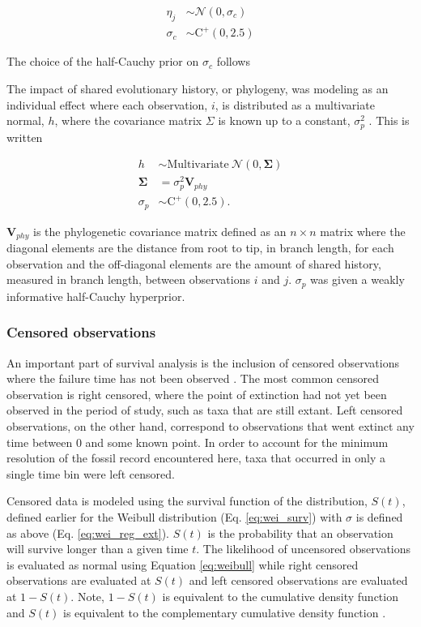 \documentclass{article}
\begin{document}
\begin{align*}
  \eta_{j} &\sim \mathcal{N}(0, \sigma_{c}) \\
  \sigma_{c} &\sim \mathrm{C}^{+}(0, 2.5)
\end{align*}

The choice of the half-Cauchy prior on \(\sigma_{c}\) follows \cite{Gelman2006a}

The impact of shared evolutionary history, or phylogeny, was modeling as an individual effect where each observation, \(i\), is distributed as a multivariate normal, \(h\), where the covariance matrix \(\Sigma\) is known up to a constant, \(\sigma_{p}^{2}\) \cite{Lynch1991,Housworth2004}. This is written

\begin{align*}
  h &\sim \mathrm{Multivariate\ }\mathcal{N}(0, \mathbf{\Sigma}) \\
  \mathbf{\Sigma} &= \sigma_{p}^{2} \mathbf{V}_{phy} \\
  \sigma_{p} &\sim \mathrm{C}^{+}(0, 2.5).
\end{align*}

\(\mathbf{V}_{phy}\) is the phylogenetic covariance matrix defined as an \(n \times n\) matrix where the diagonal elements are the distance from root to tip, in branch length, for each observation and the off-diagonal elements are the amount of shared history, measured in branch length, between observations \(i\) and \(j\). \(\sigma_{p}\) was given a weakly informative half-Cauchy hyperprior. 


\subsubsection{Censored observations} \label{sec:censor}

An important part of survival analysis is the inclusion of censored observations where the failure time has not been observed \cite{Ibrahim2001,Klein2003}. The most common censored observation is right censored, where the point of extinction had not yet been observed in the period of study, such as taxa that are still extant. Left censored observations, on the other hand, correspond to observations that went extinct any time between 0 and some known point. In order to account for the minimum resolution of the fossil record encountered here, taxa that occurred in only a single time bin were left censored.

Censored data is modeled using the survival function of the distribution, \(S(t)\), defined earlier for the Weibull distribution (Eq. \ref{eq:wei_surv}) with \(\sigma\) is defined as above (Eq. \ref{eq:wei_reg_ext}). \(S(t)\) is the probability that an observation will survive longer than a given time \(t\). The likelihood of uncensored observations is evaluated as normal using Equation \ref{eq:weibull} while right censored observations are evaluated at \(S(t)\) and left censored observations are evaluated at \(1 - S(t)\). Note, \(1 - S(t)\) is equivalent to the cumulative density function and \(S(t)\) is equivalent to the complementary cumulative density function \cite{Gelman2013d}.
\end{document}
